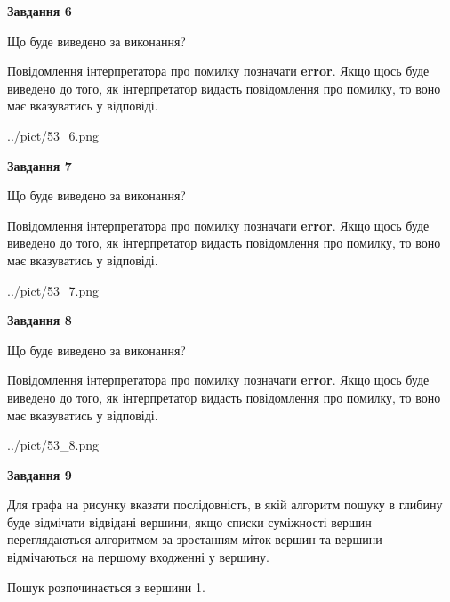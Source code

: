 \documentclass[12pt, ukrainian]{article}
\begin{document}
{\begin {large}
{\begin {center}\textbf{Завдання 6}\end {center}}\par
Що буде виведено за виконання?

Повідомлення інтерпретатора про помилку позначати \textbf{error}.
Якщо щось буде виведено до того, як інтерпретатор видасть повідомлення про помилку, 
то воно має вказуватись у відповіді. \par


\begin{center}
	{../pict/53_6.png}
\end{center}
\newpage

{\begin {center}\textbf{Завдання 7}\end {center}}\par
Що буде виведено за виконання?

Повідомлення інтерпретатора про помилку позначати \textbf{error}.
Якщо щось буде виведено до того, як інтерпретатор видасть повідомлення про помилку, 
то воно має вказуватись у відповіді. \par


\begin{center}
	{../pict/53_7.png}
\end{center}
\newpage

{\begin {center}\textbf{Завдання 8}\end {center}}\par
Що буде виведено за виконання?

Повідомлення інтерпретатора про помилку позначати \textbf{error}.
Якщо щось буде виведено до того, як інтерпретатор видасть повідомлення про помилку, 
то воно має вказуватись у відповіді. \par


\begin{center}
	{../pict/53_8.png}
\end{center}
\newpage

{\begin {center}\textbf{Завдання 9}\end {center}}\par
Для графа на рисунку вказати послідовність, в якій алгоритм пошуку в глибину буде відмічати відвідані вершини, якщо списки суміжності вершин переглядаються алгоритмом за зростанням міток вершин та вершини відмічаються на першому вход\-женні у вершину.\par
Пошук розпочинається з вершини 1.\par


\end{large}}
\end{document}
